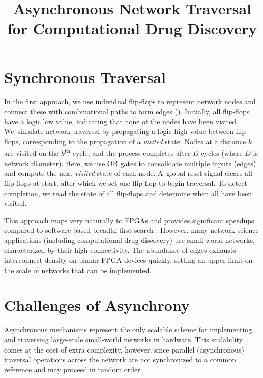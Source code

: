 \documentclass[conference]{IEEEtran}
\title{Asynchronous Network Traversal for Computational Drug Discovery}
\begin{document}
\maketitle


\vspace{0.2cm}

\section{Synchronous Traversal}
\label{sec_sync}

In the first approach, we use individual flip-flops to represent network nodes
and connect these with combinational paths to form edges ().
Initially, all flip-flops have a logic low value, indicating that none of the
nodes have been visited. We~simulate network traversal by propagating a logic
high value between flip-flops, corresponding to the propagation of a
\emph{visited} state. Nodes at a distance $k$ are visited on the
$k$\textsuperscript{th} cycle, and the process completes after $D$ cycles
(where $D$ is network diameter). Here, we use OR gates to consolidate multiple
inputs (edges) and compute the next \emph{visited} state of each node.
A~global reset signal clears all flip-flops at start, after which we set one
flip-flop to begin traversal. To detect completion, we read the state of all
flip-flops and determine when all have been visited.

This approach maps very naturally to FPGAs and provides significant speedups
compared to software-based breadth-first search \cite{fdl2017}. However, many
network science applications (including computational drug discovery) use
small-world networks, characterized by their high connectivity. The abundance
of edges exhausts interconnect density on planar FPGA devices quickly, setting
an upper limit on the scale of networks that can be implemented.

\section{Challenges of Asynchrony}

Asynchronous mechanisms represent the only scalable scheme for implementing
and traversing large-scale small-world networks in hardware. This scalability
comes at the cost of extra complexity, however, since parallel (asynchronous)
traversal operations across the network are not synchronized to a common
reference and may proceed in random order.
\end{document}
